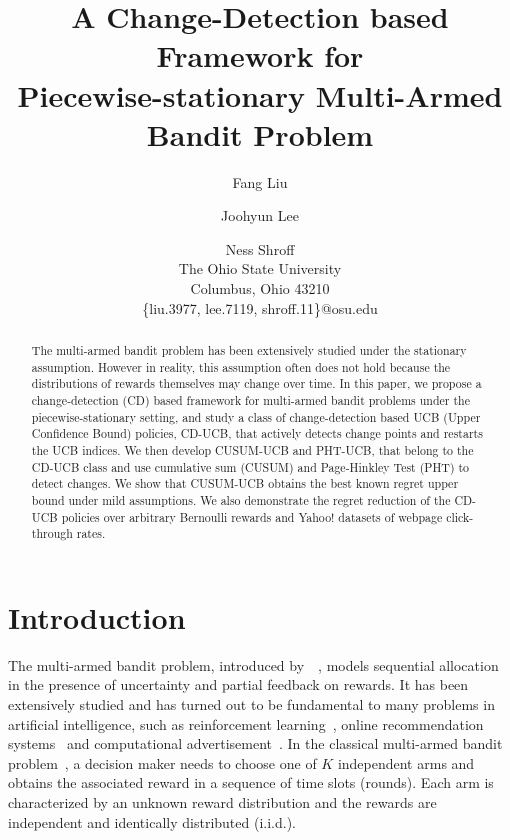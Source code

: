 \documentclass[letterpaper]{article}
\begin{document}
\title{A Change-Detection based Framework for\\ Piecewise-stationary Multi-Armed Bandit Problem}
\author{Fang Liu \and Joohyun Lee \and Ness Shroff\\
The Ohio State University\\
Columbus, Ohio 43210\\
\{liu.3977, lee.7119, shroff.11\}@osu.edu\\
}
\maketitle
\begin{abstract}
The multi-armed bandit problem has been extensively studied under the stationary assumption. However in reality, this assumption often does not hold because the distributions of rewards themselves may change over time. In this paper, we propose a change-detection (CD) based framework for multi-armed bandit problems under the piecewise-stationary setting, and study a class of change-detection based UCB (Upper Confidence Bound) policies, CD-UCB, that actively detects change points and restarts the UCB indices. We then develop CUSUM-UCB and PHT-UCB, that belong to the CD-UCB class and use cumulative sum (CUSUM) and Page-Hinkley Test (PHT) to detect changes. We show that CUSUM-UCB obtains the best known regret upper bound under mild assumptions. We also demonstrate the regret reduction of the CD-UCB policies over arbitrary Bernoulli rewards and Yahoo! datasets of webpage click-through rates.
\end{abstract}
\section{Introduction}
The multi-armed bandit problem, introduced by~\citeauthor{thompson1933likelihood}~, models sequential allocation in the presence of uncertainty and partial feedback on rewards. It has been extensively studied and has turned out to be fundamental to many problems in artificial intelligence, such as reinforcement learning~\cite{sutton1998reinforcement}, online recommendation systems~\cite{li2016collaborative} and computational advertisement~\cite{buccapatnam2017reward}. In the classical multi-armed bandit problem~\cite{lai1985asymptotically}, a decision maker needs to choose one of $K$ independent arms and obtains the associated reward in a sequence of time slots (rounds). Each arm is characterized by an unknown reward distribution and the rewards are independent and identically distributed (i.i.d.). %
\end{document}
